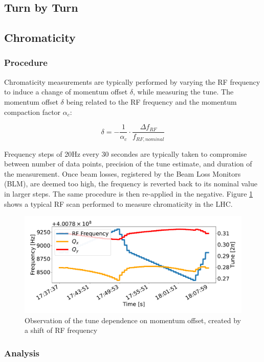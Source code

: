 
\subsection{Turn by Turn}

\lipsum[1-2]





\subsection{Chromaticity}

\subsubsection{Procedure}

Chromaticity measurements are typically performed by varying the RF frequency to induce a change of momentum offset $\delta$, while measuring the tune.
The momentum offset $\delta$ being related to the RF frequency and the momentum compaction factor $\alpha_c$:

\begin{equation}
    \delta = - \frac{1}{\alpha_c} \cdot \frac{\Delta f_{RF}}{f_{RF,nominal}}
    \label{eq:dpp_rf}
\end{equation}

Frequency steps of 20Hz every 30 secondes are typically taken to compromise between number of data points, precision of the tune estimate, and duration of the measurement.
Once beam losses, registered by the Beam Loss Monitors (BLM), are deemed too high, the frequency is reverted back to its nominal value in larger steps. The same procedure is then re-applied in the negative. Figure \ref{fig:measurements:rf_scan} shows a typical RF scan performed to measure chromaticity in the LHC.

\begin{figure}[H]
    \centering
    \includegraphics[width=1\textwidth]{images/rf_scan.pdf}
    \caption{Observation of the tune dependence on momentum offset, created by a shift of RF frequency}
    \label{fig:measurements:rf_scan}
\end{figure}




\subsubsection{Analysis}
